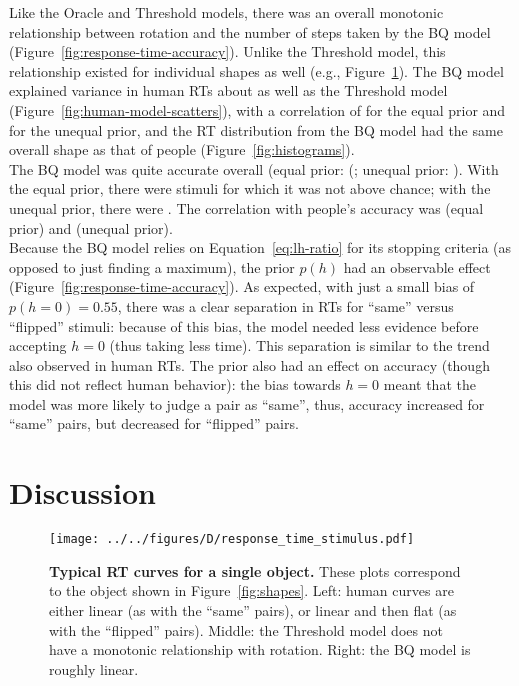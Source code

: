 \documentclass[10pt,letterpaper]{article}
\newcommand{\Oc}[0]{Oracle}
\newcommand{\Th}[0]{Threshold}
\newcommand{\Bq}[0]{BQ}
\begin{document}
Like the \Oc{} and \Th{} models, there was an overall monotonic
relationship between rotation and the number of steps taken by the
\Bq{} model (Figure~\ref{fig:response-time-accuracy}). Unlike the
\Th{} model, this relationship existed for individual shapes as well
(e.g., Figure~\ref{fig:response-time-stimulus}).  The \Bq{} model
explained variance in human RTs about as well as the \Th{} model
(Figure~\ref{fig:human-model-scatters}), with a correlation of
\BqTimeCorr{} for the equal prior and \BqpTimeCorr{} for the unequal
prior, and the RT distribution from the \Bq{} model had the same
overall shape as that of people (Figure~\ref{fig:histograms}).\\
\indent The \Bq{} model was quite accurate overall (equal prior:
(\BqAccuracy{}; unequal prior: \BqpAccuracy{}). With the equal prior,
there were \BqNumChance{} stimuli for which it was not above chance;
with the unequal prior, there were \BqpNumChance{}. The correlation
with people's accuracy was \BqAccuracyCorr{} (equal prior) and
\BqpAccuracyCorr{} (unequal prior).\\
\indent Because the \Bq{} model relies on Equation~\ref{eq:lh-ratio}
for its stopping criteria (as opposed to just finding a maximum), the
prior $p(h)$ had an observable effect
(Figure~\ref{fig:response-time-accuracy}). As expected, with just a
small bias of $p(h=0)=0.55$, there was a clear separation in RTs for
``same'' versus ``flipped'' stimuli: because of this bias, the model
needed less evidence before accepting $h=0$ (thus taking less
time). This separation is similar to the trend also observed in human
RTs. The prior also had an effect on accuracy (though this did not
reflect human behavior): the bias towards $h=0$ meant that the model
was more likely to judge a pair as ``same'', thus, accuracy increased
for ``same'' pairs, but decreased for ``flipped'' pairs.

\section{Discussion}

\begin{figure}[t]
  \begin{center}
    \texttt{[image: ../../figures/D/response\_time\_stimulus.pdf]}
    \caption{\textbf{Typical RT curves for a single object.}  These
      plots correspond to the object shown in
      Figure~\ref{fig:shapes}. Left: human curves are either linear
      (as with the ``same'' pairs), or linear and then flat (as with
      the ``flipped'' pairs). Middle: the \Th{} model does not have a
      monotonic relationship with rotation. Right: the \Bq{} model is
      roughly linear.}
    \label{fig:response-time-stimulus}
  \end{center}
\end{figure}
\end{document}
